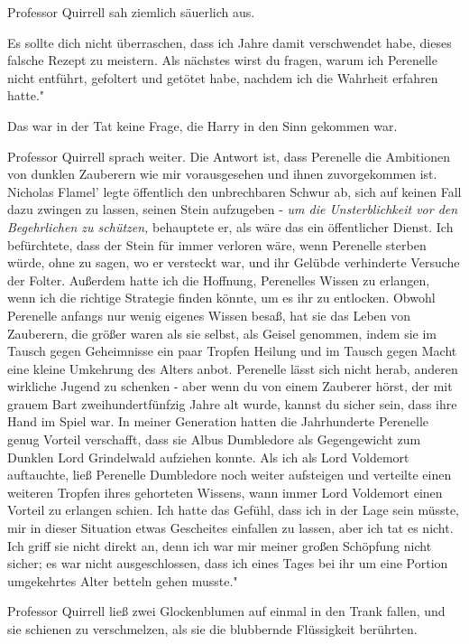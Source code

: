 Professor Quirrell sah ziemlich säuerlich aus.

\glqq{}Es sollte dich nicht überraschen, dass ich Jahre damit verschwendet habe,
dieses falsche Rezept zu meistern. Als nächstes wirst du fragen, warum ich
Perenelle nicht entführt, gefoltert und getötet habe, nachdem ich die Wahrheit
erfahren hatte."

Das war in der Tat keine Frage, die Harry in den Sinn gekommen war.

Professor Quirrell sprach weiter. \glqq{}Die Antwort ist, dass Perenelle die
Ambitionen von dunklen Zauberern wie mir vorausgesehen und ihnen zuvorgekommen
ist. Nicholas Flamel' legte öffentlich den unbrechbaren Schwur ab, sich auf
keinen Fall dazu zwingen zu lassen, seinen Stein aufzugeben - \emph{um die
Unsterblichkeit vor den Begehrlichen zu schützen,} behauptete er, als wäre das
ein öffentlicher Dienst. Ich befürchtete, dass der Stein für immer verloren
wäre, wenn Perenelle sterben würde, ohne zu sagen, wo er versteckt war, und ihr
Gelübde verhinderte Versuche der Folter. Außerdem hatte ich die Hoffnung,
Perenelles Wissen zu erlangen, wenn ich die richtige Strategie finden könnte, um
es ihr zu entlocken. Obwohl Perenelle anfangs nur wenig eigenes Wissen besaß,
hat sie das Leben von Zauberern, die größer waren als sie selbst, als Geisel
genommen, indem sie im Tausch gegen Geheimnisse ein paar Tropfen Heilung und im
Tausch gegen Macht eine kleine Umkehrung des Alters anbot. Perenelle lässt sich
nicht herab, anderen wirkliche Jugend zu schenken - aber wenn du von einem
Zauberer hörst, der mit grauem Bart zweihundertfünfzig Jahre alt wurde, kannst
du sicher sein, dass ihre Hand im Spiel war. In meiner Generation hatten die
Jahrhunderte Perenelle genug Vorteil verschafft, dass sie Albus Dumbledore als
Gegengewicht zum Dunklen Lord Grindelwald aufziehen konnte. Als ich als Lord
Voldemort auftauchte, ließ Perenelle Dumbledore noch weiter aufsteigen und
verteilte einen weiteren Tropfen ihres gehorteten Wissens, wann immer Lord
Voldemort einen Vorteil zu erlangen schien. Ich hatte das Gefühl, dass ich in
der Lage sein müsste, mir in dieser Situation etwas Gescheites einfallen zu
lassen, aber ich tat es nicht. Ich griff sie nicht direkt an, denn ich war mir
meiner großen Schöpfung nicht sicher; es war nicht ausgeschlossen, dass ich
eines Tages bei ihr um eine Portion umgekehrtes Alter betteln gehen musste."

Professor Quirrell ließ zwei Glockenblumen auf einmal in den Trank fallen, und
sie schienen zu verschmelzen, als sie die blubbernde Flüssigkeit berührten.

